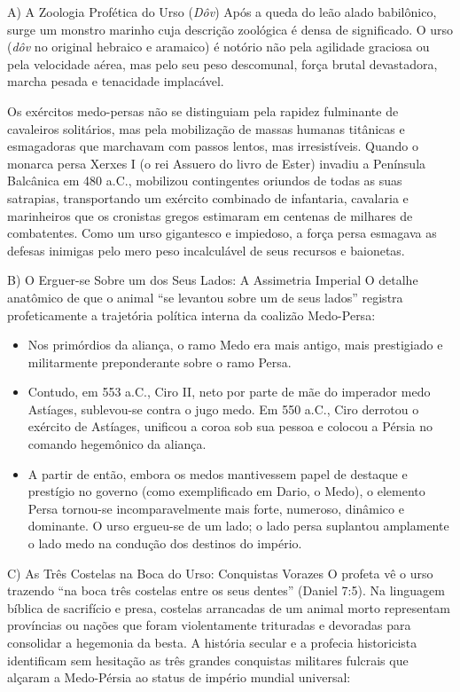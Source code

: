 \documentclass[11pt,a4paper,openany]{book}
\begin{document}
A) A Zoologia Profética do Urso (\textit{Dôv})
Após a queda do leão alado babilônico, surge um monstro marinho cuja descrição zoológica é densa de significado. O urso (\textit{dôv} no original hebraico e aramaico) é notório não pela agilidade graciosa ou pela velocidade aérea, mas pelo seu peso descomunal, força brutal devastadora, marcha pesada e tenacidade implacável.

Os exércitos medo-persas não se distinguiam pela rapidez fulminante de cavaleiros solitários, mas pela mobilização de massas humanas titânicas e esmagadoras que marchavam com passos lentos, mas irresistíveis. Quando o monarca persa Xerxes I (o rei Assuero do livro de Ester) invadiu a Península Balcânica em 480 a.C., mobilizou contingentes oriundos de todas as suas satrapias, transportando um exército combinado de infantaria, cavalaria e marinheiros que os cronistas gregos estimaram em centenas de milhares de combatentes. Como um urso gigantesco e impiedoso, a força persa esmagava as defesas inimigas pelo mero peso incalculável de seus recursos e baionetas.

B) O Erguer-se Sobre um dos Seus Lados: A Assimetria Imperial
O detalhe anatômico de que o animal ``se levantou sobre um de seus lados'' registra profeticamente a trajetória política interna da coalizão Medo-Persa:
\begin{itemize}
  \item Nos primórdios da aliança, o ramo Medo era mais antigo, mais prestigiado e militarmente preponderante sobre o ramo Persa.
  \item Contudo, em 553 a.C., Ciro II, neto por parte de mãe do imperador medo Astíages, sublevou-se contra o jugo medo. Em 550 a.C., Ciro derrotou o exército de Astíages, unificou a coroa sob sua pessoa e colocou a Pérsia no comando hegemônico da aliança.
  \item A partir de então, embora os medos mantivessem papel de destaque e prestígio no governo (como exemplificado em Dario, o Medo), o elemento Persa tornou-se incomparavelmente mais forte, numeroso, dinâmico e dominante. O urso ergueu-se de um lado; o lado persa suplantou amplamente o lado medo na condução dos destinos do império.
\end{itemize}


C) As Três Costelas na Boca do Urso: Conquistas Vorazes
O profeta vê o urso trazendo ``na boca três costelas entre os seus dentes'' (Daniel 7:5). Na linguagem bíblica de sacrifício e presa, costelas arrancadas de um animal morto representam províncias ou nações que foram violentamente trituradas e devoradas para consolidar a hegemonia da besta. A história secular e a profecia historicista identificam sem hesitação as três grandes conquistas militares fulcrais que alçaram a Medo-Pérsia ao status de império mundial universal:
\end{document}
